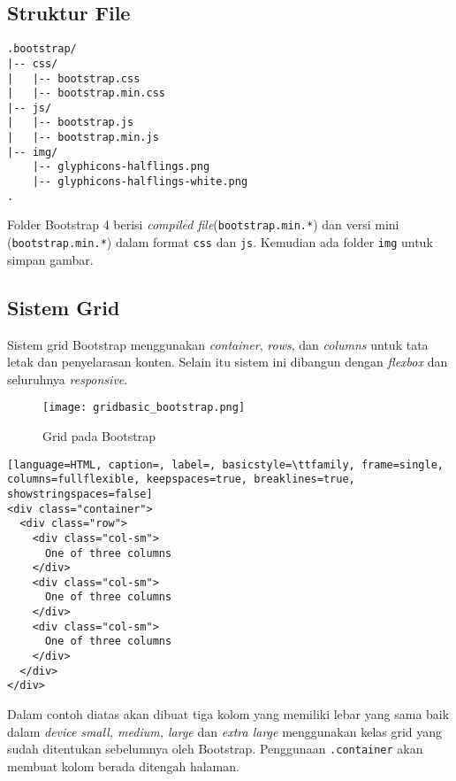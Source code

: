\subsection{Struktur File}
\begin{lstlisting}[basicstyle=\ttfamily, frame=single,
columns=fullflexible, keepspaces=true, breaklines=true, label=ls:8]
.bootstrap/
|-- css/
|   |-- bootstrap.css 
|   |-- bootstrap.min.css 
|-- js/
|   |-- bootstrap.js
|   |-- bootstrap.min.js
|-- img/
    |-- glyphicons-halflings.png
    |-- glyphicons-halflings-white.png
.
\end{lstlisting}
Folder Bootstrap 4 berisi \textit{compiled file}(\texttt{bootstrap.min.*}) dan versi mini (\texttt{bootstrap.min.*}) dalam format \texttt{css} dan \texttt{js}. Kemudian ada folder \texttt{img} untuk simpan gambar.

\subsection{Sistem Grid}
Sistem grid Bootstrap menggunakan \textit{container}, \textit{rows}, dan \textit{columns} untuk tata letak dan penyelarasan konten. Selain itu sistem ini dibangun dengan \textit{flexbox} dan seluruhnya \textit{responsive}. \cite{bootstrap:19}
\begin{figure} [H]
	\centering  
	\texttt{[image: gridbasic\_bootstrap.png]}  
	\caption{Grid pada Bootstrap} 
\end{figure}

\begin{lstlisting}[language=HTML, caption=, label=, basicstyle=\ttfamily, frame=single, columns=fullflexible, keepspaces=true, breaklines=true, showstringspaces=false] 
<div class="container">
  <div class="row">
    <div class="col-sm">
      One of three columns
    </div>
    <div class="col-sm">
      One of three columns
    </div>
    <div class="col-sm">
      One of three columns
    </div>
  </div>
</div>
\end{lstlisting}
Dalam contoh diatas akan dibuat tiga kolom yang memiliki lebar yang sama baik dalam \textit{device} \textit{small, medium, large} dan \textit{extra large} menggunakan kelas grid yang sudah ditentukan sebelumnya oleh Bootstrap. Penggunaan \verb|.container| akan membuat kolom berada ditengah halaman.

